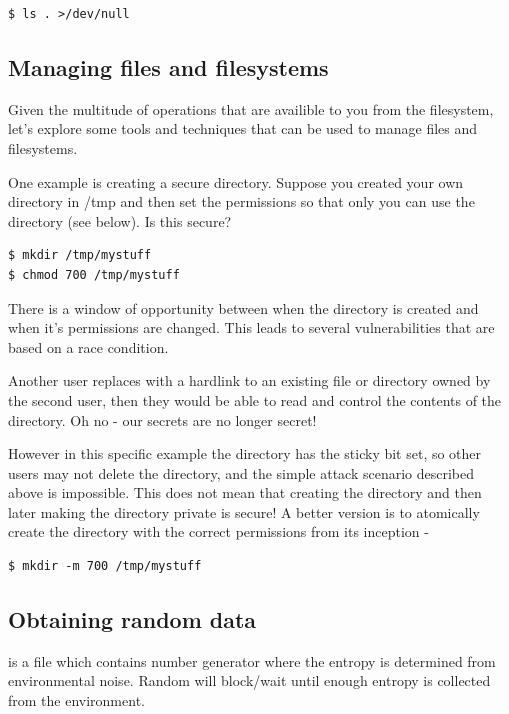 \begin{lstlisting}
$ ls . >/dev/null
\end{lstlisting}

\subsection{Managing files and filesystems}

Given the multitude of operations that are availible to you from the filesystem, let's explore some tools and techniques that can be used to manage files and filesystems. 

One example is creating a secure directory. Suppose you created your own directory in /tmp and then set the permissions so that only you can use the directory (see below). Is this secure?

\begin{lstlisting}
$ mkdir /tmp/mystuff
$ chmod 700 /tmp/mystuff
\end{lstlisting}

There is a window of opportunity between when the directory is created and when it's permissions are changed. This leads to several vulnerabilities that are based on a race condition.

Another user replaces  with a hardlink to an existing file or directory owned by the second user, then they would be able to read and control the contents of the  directory. Oh no - our secrets are no longer secret!

However in this specific example the  directory has the sticky bit set, so other users may not delete the  directory, and the simple attack scenario described above is impossible. This does not mean that creating the directory and then later making the directory private is secure! A better version is to atomically create the directory with the correct permissions from its inception -

\begin{lstlisting}
$ mkdir -m 700 /tmp/mystuff
\end{lstlisting}

\subsection{Obtaining random data}\label{differences-between-random-and-urandom}

 is a file which contains number generator where the entropy is determined from environmental noise. Random will block/wait until enough entropy is collected from the environment.

